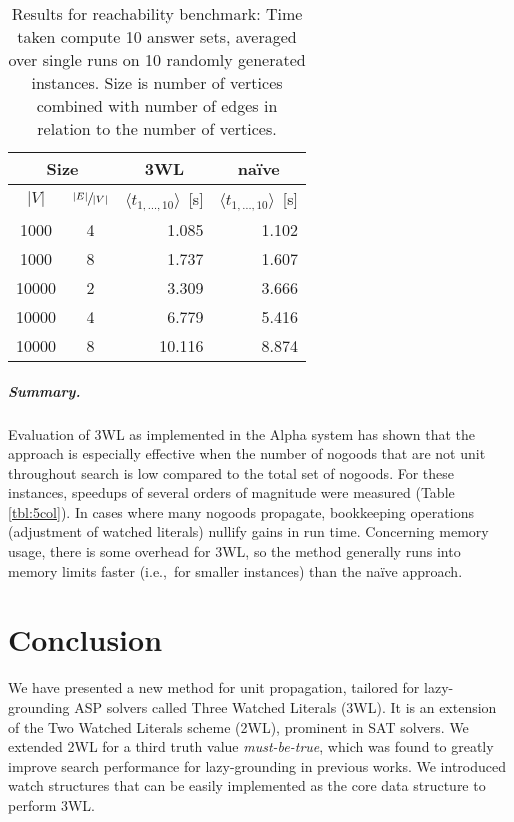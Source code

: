 \documentclass[final]{vutinfth} %
\newcommand{\mbt}{must-be-true\xspace}
\begin{document}
\begin{table}
	\begin{center}
	\begin{tabular}{|cc||r|r|}
\hline
\multicolumn{2}{|c||}{Size} & \multicolumn{1}{c|}{3WL} & \multicolumn{1}{c|}{na\"{i}ve} \\ 
\hline
$|V|$ & $\sfrac{|E|}{|V|}$& $\langle t_{1, \ldots, 10} \rangle$~[s]& $\langle t_{1, \ldots, 10} \rangle$~[s]\\
\hline
\hline
 1000 & 4 & 	  1.085 &	  1.102 \\
 1000 & 8 & 	  1.737 &	  1.607 \\
10000 & 2 & 	  3.309 &	  3.666 \\
10000 & 4 & 	  6.779 &	  5.416 \\
10000 & 8 & 	 10.116 &	  8.874 \\
\hline
	\end{tabular}
	\end{center}
	\caption[Results for reachability benchmark]{Results for reachability benchmark: Time taken compute 10 answer sets, averaged over single runs on 10 randomly generated instances. Size is number of vertices combined with number of edges in relation to the number of vertices.}
	\label{tbl:reach}
\end{table}

\paragraph{Summary.} Evaluation of 3WL as implemented in the Alpha system has shown that the approach is especially effective when the number of nogoods that are not unit throughout search is low compared to the total set of nogoods. For these instances, speedups of several orders of magnitude were measured (Table \ref{tbl:5col}). In cases where many nogoods propagate, bookkeeping operations (adjustment of watched literals) nullify gains in run time. Concerning memory usage, there is some overhead for 3WL, so the method generally runs into memory limits faster (i.e.,~for smaller instances) than the na\"{i}ve approach.

\chapter{Conclusion}
\label{chap:conc}

We have presented a new method for unit propagation, tailored for lazy-grounding ASP solvers called Three Watched Literals (3WL). It is an extension of the Two Watched Literals scheme (2WL), prominent in SAT solvers. We extended 2WL for a third truth value \emph{\mbt}, which was found to greatly improve search performance for lazy-grounding in previous works. We introduced watch structures that can be easily implemented as the core data structure to perform 3WL.
\end{document}
